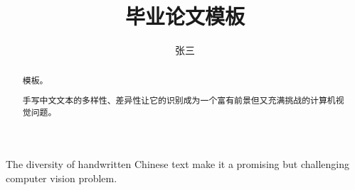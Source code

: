 \documentclass[winfonts]{njuthesis}
\title{毕业论文模板}
\author{张三}
\begin{document}
\maketitle

\begin{abstract}
模板。

手写中文文本的多样性、差异性让它的识别成为一个富有前景但又充满挑战的计算机视觉问题。

\end{abstract}

\begin{englishabstract}
The diversity of handwritten Chinese text make it a promising but challenging computer vision problem. 
\end{englishabstract}

%
%
%
%

\tableofcontents



\mainmatter
\end{document}
